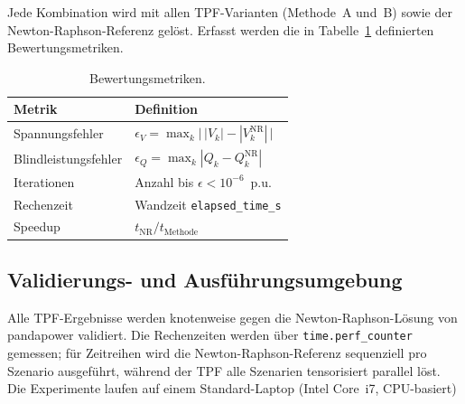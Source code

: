Jede Kombination wird mit allen TPF-Varianten (Methode~A und~B) sowie der Newton-Raphson-Referenz gelöst. Erfasst werden die in
Tabelle~\ref{tab:metriken} definierten Bewertungsmetriken.

\begin{table}[htbp]
	\centering
	\caption{Bewertungsmetriken.}
	\label{tab:metriken}
	\begin{tabular}{ll}
		\toprule
		\textbf{Metrik} & \textbf{Definition} \\
		\midrule
		Spannungsfehler       & $\epsilon_V = \max_k \bigl|\,|V_k| - |V_k^{\mathrm{NR}}|\,\bigr|$ \\
		Blindleistungsfehler  & $\epsilon_Q = \max_k |Q_k - Q_k^{\mathrm{NR}}|$ \\
		Iterationen           & Anzahl bis $\epsilon < 10^{-6}$~p.u. \\
		Rechenzeit            & Wandzeit \texttt{elapsed\_time\_s} \\
		Speedup               & $t_{\mathrm{NR}} / t_{\mathrm{Methode}}$ \\
		\bottomrule
	\end{tabular}
\end{table}

\subsection{Validierungs- und Ausführungsumgebung}

Alle TPF-Ergebnisse werden knotenweise gegen die Newton-Raphson-Lösung von pandapower
validiert. Die Rechenzeiten werden über
\texttt{time.perf\_counter} gemessen; für Zeitreihen wird die Newton-Raphson-Referenz
sequenziell pro Szenario ausgeführt, während der TPF alle Szenarien tensorisiert
parallel löst. Die Experimente laufen auf einem Standard-Laptop
(Intel Core~i7, CPU-basiert)